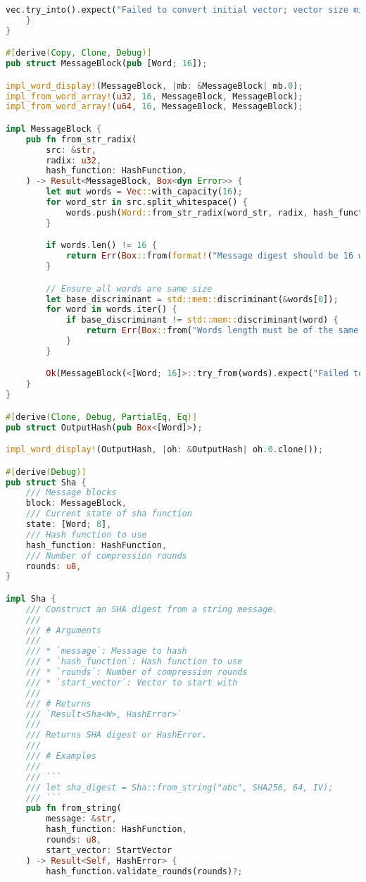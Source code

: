 \begin{lstlisting}[language=rust, caption={sha/sha.rs}]
		vec.try_into().expect("Failed to convert initial vector; vector size mismatch!")
	}
}

#[derive(Copy, Clone, Debug)]
pub struct MessageBlock(pub [Word; 16]);

impl_word_display!(MessageBlock, |mb: &MessageBlock| mb.0);
impl_from_word_array!(u32, 16, MessageBlock, MessageBlock);
impl_from_word_array!(u64, 16, MessageBlock, MessageBlock);

impl MessageBlock {
	pub fn from_str_radix(
		src: &str,
		radix: u32,
		hash_function: HashFunction,
	) -> Result<MessageBlock, Box<dyn Error>> {
		let mut words = Vec::with_capacity(16);
		for word_str in src.split_whitespace() {
			words.push(Word::from_str_radix(word_str, radix, hash_function)?);
		}

		if words.len() != 16 {
			return Err(Box::from(format!("Message digest should be 16 words in length, parsed {} instead", words.len())));
		}

		// Ensure all words are same size
		let base_discriminant = std::mem::discriminant(&words[0]);
		for word in words.iter() {
			if base_discriminant != std::mem::discriminant(word) {
				return Err(Box::from("Words length must be of the same size, parsed both u32 and u64"));
			}
		}

		Ok(MessageBlock(<[Word; 16]>::try_from(words).expect("Failed to word Vec convert to array")))
	}
}

#[derive(Clone, Debug, PartialEq, Eq)]
pub struct OutputHash(pub Box<[Word]>);

impl_word_display!(OutputHash, |oh: &OutputHash| oh.0.clone());

#[derive(Debug)]
pub struct Sha {
	/// Message blocks
	block: MessageBlock,
	/// Current state of sha function
	state: [Word; 8],
	/// Hash function to use
	hash_function: HashFunction,
	/// Number of compression rounds
	rounds: u8,
}

impl Sha {
	/// Construct an SHA digest from a string message.
	///
	/// # Arguments
	///
	/// * `message`: Message to hash
	/// * `hash_function`: Hash function to use
	/// * `rounds`: Number of compression rounds
	/// * `start_vector`: Vector to start with
	///
	/// # Returns
	/// `Result<Sha<W>, HashError>`
	///
	/// Returns SHA digest or HashError.
	///
	/// # Examples
	///
	/// ```
	/// let sha_digest = Sha::from_string("abc", SHA256, 64, IV);
	/// ```
	pub fn from_string(
		message: &str,
		hash_function: HashFunction,
		rounds: u8,
		start_vector: StartVector
	) -> Result<Self, HashError> {
		hash_function.validate_rounds(rounds)?;


\end{lstlisting}
